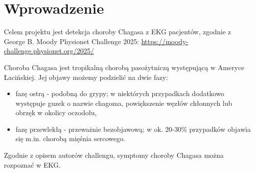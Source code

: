\section{Wprowadzenie}
Celem projektu jest detekcja choroby Chagasa z EKG pacjentów, zgodnie z George B. Moody
Physionet Challenge 2025: \url{https://moody-challenge.physionet.org/2025/}

Choroba Chagasa jest tropikalną chorobą pasożytniczą występującą w Ameryce Łacińskiej.
Jej objawy możemy podzielić na dwie fazy:
\begin{itemize}
    \item fazę ostrą - podobną do grypy; w niektórych przypadkach dodatkowo występuje guzek
    o nazwie chagoma, powiększenie węzłów chłonnych lub obrzęk w okolicy oczodołu,
    \item fazę przewlekłą - przeważnie bezobjawową; w ok. 20-30\% przypadków objawia się
    m.in. chorobą mięśnia sercowego.
\end{itemize}

Zgodnie z opisem autorów challengu, symptomy choroby Chagasa można rozpoznać w EKG.